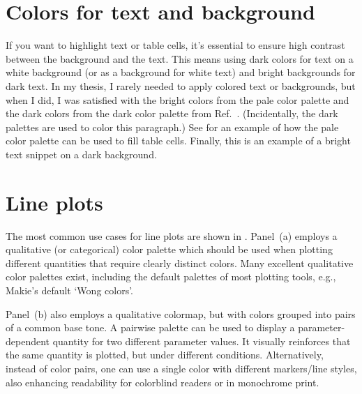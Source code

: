 \section{Colors for text and background}
{\color{dqblue} If you want to highlight text or table cells, it's essential to ensure high contrast between the background and the text.} 
{\color{dqcyan} This means using dark colors for text on a white background (or as a background for white text) and bright backgrounds for dark text.}
{\color{dqgreen} In my thesis, I rarely needed to apply colored text or backgrounds, but when I did, I was satisfied with the bright colors from the pale color palette and the dark colors from the dark color palette from Ref.~\cite{paultol}.} 
{\color{dqyellow}(Incidentally, the dark palettes are used to color this paragraph.)}
{\color{dqred} See  for an example of how the pale color palette can be used to fill table cells.}
\colorbox{dqblue}{\color{white}Finally, this} \colorbox{dqcyan}{\color{white}is an example} \colorbox{dqgreen}{\color{white}of a bright text} \colorbox{dqyellow}{\color{white}snippet on a} \colorbox{dqred}{\color{white}dark background.}

\section{Line plots}\label{sec:line_plots}

The most common use cases for line plots are shown in . 
Panel~(a) employs a qualitative (or categorical) color palette which should be used when plotting different quantities that require clearly distinct colors. Many excellent qualitative color palettes exist, including the default palettes of most plotting tools, e.g., Makie's default `Wong colors'\cite{wong2011}.

Panel~(b) also employs a qualitative colormap, but with colors grouped into pairs of a common base tone. A pairwise palette can be used to display a parameter-dependent quantity for two different parameter values. It visually reinforces that the same quantity is plotted, but under different conditions.
Alternatively, instead of color pairs, one can use a single color with different markers/line styles, also enhancing readability for colorblind readers or in monochrome print. 

